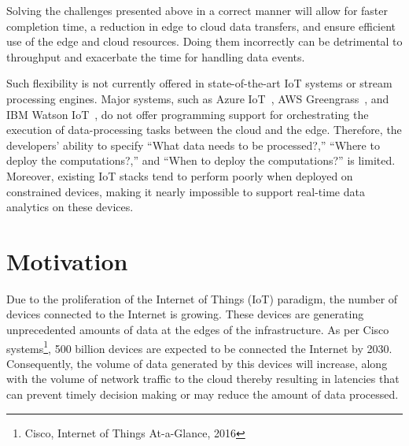 Solving the challenges presented above in a correct manner will allow for faster completion time, a reduction in edge to cloud data transfers, and ensure efficient use of the edge and cloud resources. Doing them incorrectly can be detrimental to throughput and exacerbate the time for handling data events.
 
Such flexibility is not currently offered in state-of-the-art IoT systems or stream processing engines. Major systems, such as Azure IoT~\cite{azure}, AWS Greengrass~\cite{amazon}, and IBM Watson IoT~\cite{IBM}, do not offer programming support for orchestrating the execution of data-processing tasks between the cloud and the edge. Therefore, the developers' ability to specify ``What data needs to be processed?,'' ``Where to deploy the computations?,'' and ``When to deploy the computations?'' is limited. Moreover, existing IoT stacks tend to perform poorly when deployed on constrained devices, making it nearly impossible to support real-time data analytics on these devices.


\section{Motivation}

Due to the proliferation of the Internet of Things (IoT) paradigm, the number of devices connected to the Internet is growing. These devices are generating unprecedented amounts of data at the edges of the infrastructure. As per Cisco systems\footnote{Cisco, Internet of Things At-a-Glance, 2016 }, 500 billion devices are expected to be connected the Internet by 2030. Consequently, the volume of data generated by this devices will increase, along with the volume of network traffic to the cloud thereby resulting in latencies that can prevent timely decision making or may reduce the amount of data processed.


